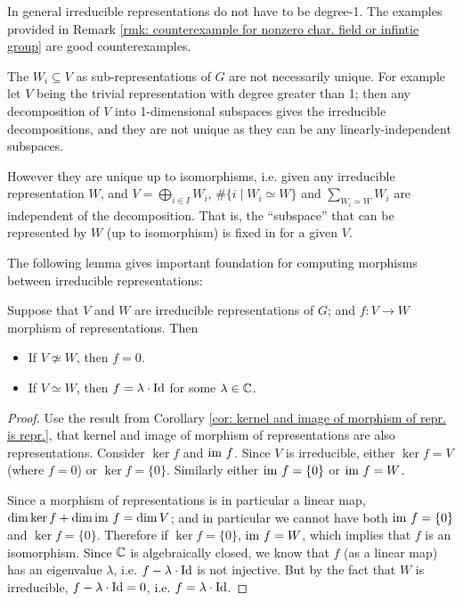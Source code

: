 \begin{remark}
    In general irreducible representations do not have to be degree-1. The examples provided in Remark \ref{rmk: counterexample for nonzero char. field or infintie group} are good counterexamples. 
\end{remark}

\begin{remark}\label{rmk: decomposition of repr. unique up to isom}
    The $W_i \subseteq V$ as sub-representations of $G$ are not necessarily unique. For example let $V$ being the trivial representation with degree greater than 1; then any decomposition of $V$ into 1-dimensional subspaces gives the irreducible decompositions, and they are not unique as they can be any linearly-independent subspaces.

    However they are unique up to isomorphisms, i.e. given any irreducible representation $W$, and $V = \bigoplus_{i \in I} W_i$, $\#\{ i \mid W_i \simeq W \}$ and $\sum_{W_i \simeq W} W_i$ are independent of the decomposition. That is, the ``subspace'' that can be represented by $W$ (up to isomorphism) is fixed in for a given $V$. 
\end{remark}

\textstart
The following lemma gives important foundation for computing morphisms between irreducible representations:

\begin{lemma}[Schur]\label{lem: Schur}
    Suppose that $V$ and $W$ are irreducible representations of $G$; and $f: V \to W$ morphism of representations. Then
    \begin{itemize}
        \item If $V \nsimeq W$, then $f = 0$.
        \item If $V \simeq W$, then $f = \lambda\cdot\mathrm{Id}$ for some $\lambda \in \mathbb{C}$.
    \end{itemize}
\end{lemma}

\begin{proof}
    Use the result from Corollary \ref{cor: kernel and image of morphism of repr. is repr.}, that kernel and image of morphism of representations are also representations. Consider $\ker f$ and $\mathrm{im}\  f$. Since $V$ is irreducible, either $\ker f = V$ (where $f = 0$) or $\ker f = \{0\}$. Similarly either $\mathrm{im}\  f = \{0\}$ or $\mathrm{im}\  f = W$.
    
    Since a morphism of representations is in particular a linear map, $\dim \ker f + \dim \mathrm{im}\  f = \dim V$; and in particular we cannot have both $\mathrm{im}\  f = \{0\}$ and $\ker f = \{0\}$. Therefore if $\ker f = \{0\}$, $\mathrm{im}\  f = W$, which implies that $f$ is an isomorphism. Since $\mathbb{C}$ is algebraically closed, we know that $f$ (as a linear map) has an eigenvalue $\lambda$, i.e. $f - \lambda \cdot \mathrm{Id}$ is not injective. But by the fact that $W$ is irreducible, $f - \lambda \cdot \mathrm{Id} = 0$, i.e. $f = \lambda \cdot \mathrm{Id}$. 
\end{proof}

